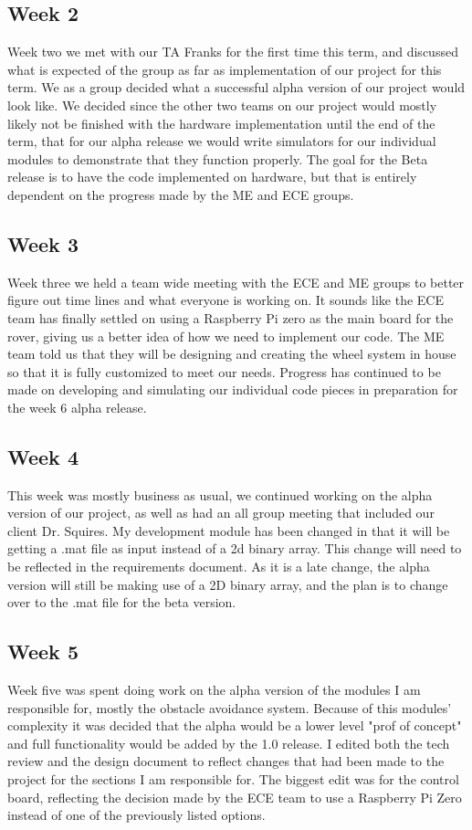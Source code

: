 \documentclass[10pt,letterpaper,onecolumn,draftclsnofoot,journal]{IEEEtran}
\begin{document}
\subsection{Week 2}
Week two we met with our TA Franks for the first time this term, and discussed what is expected of the group as far as implementation of our project for this term. We as a group decided what a successful alpha version of our project would look like. We decided since the other two teams on our project would mostly likely not be finished with the hardware implementation until the end of the term, that for our alpha release we would write simulators for our individual modules to demonstrate that they function properly. The goal for the Beta release is to have the code implemented on hardware, but that is entirely dependent on the progress made by the ME and ECE groups.


\subsection{Week 3}
Week three we held a team wide meeting with the ECE and ME groups to better figure out time lines and what everyone is working on. It sounds like the ECE team has finally settled on using a Raspberry Pi zero as the main board for the rover, giving us a better idea of how we need to implement our code. The ME team told us that they will be designing and creating the wheel system in house so that it is fully customized to meet our needs. Progress has continued to be made on developing and simulating our individual code pieces in preparation for the week 6 alpha release.

\subsection{Week 4}
This week was mostly business as usual, we continued working on the alpha version of our project, as well as had an all group meeting that included our client Dr. Squires. My development module has been changed in that it will be getting a .mat file as input instead of a 2d binary array. This change will need to be reflected in the requirements document. As it is a late change, the alpha version will still be making use of a 2D binary array, and the plan is to change over to the .mat file for the beta version.

\subsection{Week 5}
Week five was spent doing work on the alpha version of the modules I am responsible for, mostly the obstacle avoidance system. Because of this modules' complexity it was decided that the alpha would be a lower level "prof of concept" and full functionality would be added by the 1.0 release. I edited both the tech review and the design document to reflect changes that had been made to the project for the sections I am responsible for. The biggest edit was for the control board, reflecting the decision made by the ECE team to use a Raspberry Pi Zero instead of one of the previously listed options.
\end{document}
